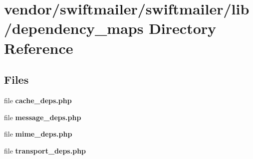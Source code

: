 \section{vendor/swiftmailer/swiftmailer/lib/dependency\+\_\+maps Directory Reference}
\label{dir_dbf084afadf0a4e0751674c3e75a483d}
\subsection*{Files}
\begin{DoxyCompactItemize}
\item 
file {\bf cache\+\_\+deps.\+php}
\item 
file {\bf message\+\_\+deps.\+php}
\item 
file {\bf mime\+\_\+deps.\+php}
\item 
file {\bf transport\+\_\+deps.\+php}
\end{DoxyCompactItemize}
